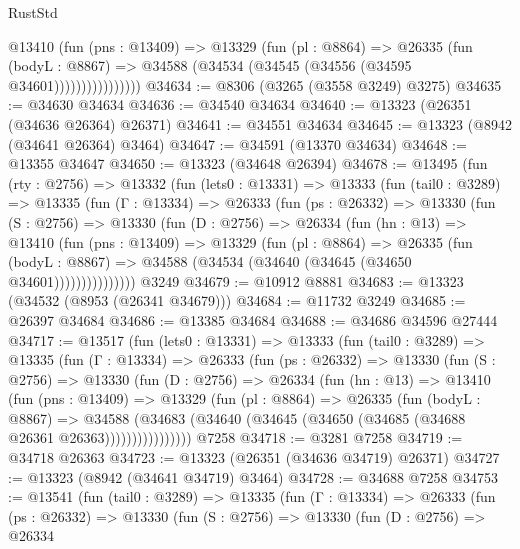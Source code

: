 \begin{lexlean}{RustStd}
\begin{coremodule}
                    @13410
                      (fun (pns : @13409) =>
                      @13329
                        (fun (pl : @8864) =>
                        @26335
                          (fun (bodyL : @8867) =>
                          @34588 (@34534 (@34545 (@34556 (@34595 @34601))))))))))))))))
@34634 := @8306 (@3265 (@3558 @3249) @3275)
@34635 := @34630 @34634
@34636 := @34540 @34634
@34640 := @13323 (@26351 (@34636 @26364) @26371)
@34641 := @34551 @34634
@34645 := @13323 (@8942 (@34641 @26364) @3464)
@34647 := @34591 (@13370 @34634)
@34648 := @13355 @34647
@34650 := @13323 (@34648 @26394)
@34678 := @13495
    (fun (rty : @2756) =>
    @13332
      (fun (lets0 : @13331) =>
      @13333
        (fun (tail0 : @3289) =>
        @13335
          (fun (Γ : @13334) =>
          @26333
            (fun (ps : @26332) =>
            @13330
              (fun (S : @2756) =>
              @13330
                (fun (D : @2756) =>
                @26334
                  (fun (hn : @13) =>
                  @13410
                    (fun (pns : @13409) =>
                    @13329
                      (fun (pl : @8864) =>
                      @26335
                        (fun (bodyL : @8867) =>
                        @34588 (@34534 (@34640 (@34645 (@34650 @34601)))))))))))))))
    @3249
@34679 := @10912 @8881
@34683 := @13323 (@34532 (@8953 (@26341 @34679)))
@34684 := @11732 @3249
@34685 := @26397 @34684
@34686 := @13385 @34684
@34688 := @34686 @34596 @27444
@34717 := @13517
    (fun (lets0 : @13331) =>
    @13333
      (fun (tail0 : @3289) =>
      @13335
        (fun (Γ : @13334) =>
        @26333
          (fun (ps : @26332) =>
          @13330
            (fun (S : @2756) =>
            @13330
              (fun (D : @2756) =>
              @26334
                (fun (hn : @13) =>
                @13410
                  (fun (pns : @13409) =>
                  @13329
                    (fun (pl : @8864) =>
                    @26335
                      (fun (bodyL : @8867) =>
                      @34588
                        (@34683
                          (@34640 (@34645 (@34650 (@34685 (@34688 @26361 @26363))))))))))))))))
    @7258
@34718 := @3281 @7258
@34719 := @34718 @26363
@34723 := @13323 (@26351 (@34636 @34719) @26371)
@34727 := @13323 (@8942 (@34641 @34719) @3464)
@34728 := @34688 @7258
@34753 := @13541
    (fun (tail0 : @3289) =>
    @13335
      (fun (Γ : @13334) =>
      @26333
        (fun (ps : @26332) =>
        @13330
          (fun (S : @2756) =>
          @13330
            (fun (D : @2756) =>
            @26334

\end{coremodule}
\end{lexlean}
